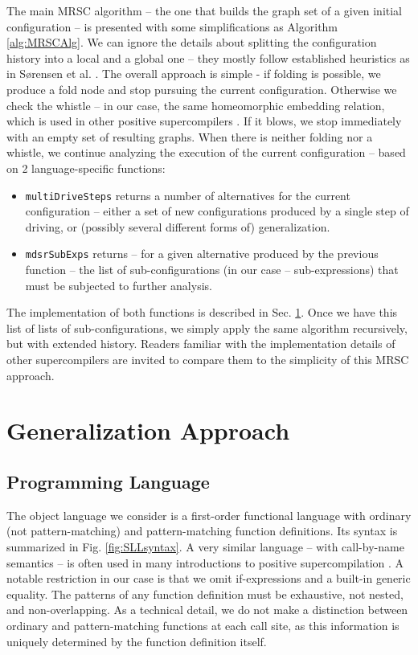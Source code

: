 \documentclass[submission,copyright,creativecommons]{eptcs}
\begin{document}
The main MRSC algorithm -- the one that builds the graph set of a given initial
configuration -- is presented with some simplifications as Algorithm \ref{alg:MRSCAlg}.
We can ignore the details about splitting the configuration history into a local
and a global one -- they mostly follow established heuristics as in S{\o}rensen et al. 
\cite{Sorensen1994TurchinSupercompiler,sorm98b}.
The overall approach is simple - if folding is possible, we produce a fold node 
and stop pursuing the current configuration.
Otherwise we check the whistle -- in our case, the same homeomorphic embedding relation,
which is used in other positive supercompilers \cite{sorm98b}.
If it blows, we stop immediately with an empty set of resulting graphs.
When there is neither folding nor a whistle, we continue analyzing the execution of the
current configuration -- based on 2 language-specific functions:
\begin{itemize}
  \item \verb|multiDriveSteps| returns a number of alternatives for the current configuration --
    either a set of new configurations produced by a single step of driving, 
    or (possibly several different forms of) generalization.
  \item \verb|mdsrSubExps| returns -- for a given alternative produced by the previous function --
    the list of sub-configurations (in our case -- sub-expressions) that must be subjected
    to further analysis.
\end{itemize}
The implementation of both functions is described in Sec. \ref{sec:Generalize}.
Once we have this list of lists of sub-configurations, we simply apply the same
algorithm recursively, but with extended history.
Readers familiar with the implementation details of other supercompilers are
invited to compare them to the simplicity of this MRSC approach.

\section{Generalization Approach}\label{sec:Generalize}

\subsection{Programming Language}

The object language we consider is a first-order functional language with ordinary (not pattern-matching) and 
pattern-matching function definitions.
Its syntax is summarized in Fig. \ref{fig:SLLsyntax}.
A very similar language -- with call-by-name semantics -- is often used in many introductions to positive
supercompilation \cite{Sorensen1994TurchinSupercompiler,sorm98b,TMR/SCP2014}.
A notable restriction in our case is that we omit if-expressions and a built-in generic equality.
The patterns of any function definition must be exhaustive, not nested, and non-overlapping.
As a technical detail, we do not make a distinction between ordinary and pattern-matching functions
at each call site, as this information is uniquely determined by the function definition itself.
\end{document}
